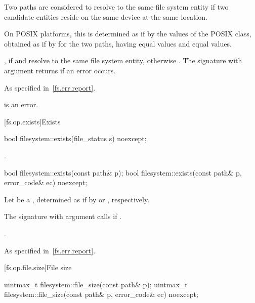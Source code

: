 \begin{itemdescr}
\pnum
Two paths are considered to resolve to the same file system entity if two
  candidate entities reside on the same device at the same location.
  \begin{note}
  On POSIX platforms, this is
  determined as if by the values of the POSIX  class,
  obtained as if by  for the two paths, having equal  values
  and equal  values.
  \end{note}

\pnum
\returns
{}, if  and  resolve to the same file
  system entity, otherwise . The signature with argument 
  returns  if an error occurs.

\pnum
\throws
As specified in~\ref{fs.err.report}.

\pnum
\remarks
{} is an error.
\end{itemdescr}


[fs.op.exists]{Exists}

%
\begin{itemdecl}
bool filesystem::exists(file_status s) noexcept;
\end{itemdecl}

\begin{itemdescr}
\pnum
\returns
{}.
\end{itemdescr}

%
\begin{itemdecl}
bool filesystem::exists(const path& p);
bool filesystem::exists(const path& p, error_code& ec) noexcept;
\end{itemdecl}

\begin{itemdescr}
\pnum
Let  be a ,
determined as if by  or , respectively.

\pnum
\effects
The signature with argument  calls 
if .

\pnum
\returns
{}.

\pnum
\throws
As specified in~\ref{fs.err.report}.
\end{itemdescr}


[fs.op.file.size]{File size}

%
\begin{itemdecl}
uintmax_t filesystem::file_size(const path& p);
uintmax_t filesystem::file_size(const path& p, error_code& ec) noexcept;
\end{itemdecl}

